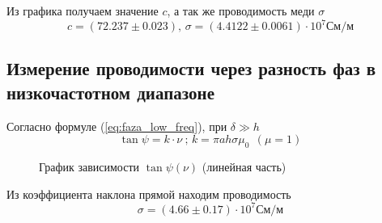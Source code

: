\documentclass[a4paper]{article}
\begin{document}
Из графика получаем значение $c$, а так же проводимость меди $\sigma$
\begin{equation}
    c=(72.237 \pm 0.023) \text{, } \sigma = (4.4122 \pm 0.0061) \cdot 10^7 См/м
\end{equation}

\newpage

\subsection{Измерение проводимости через разность фаз в низкочастотном диапазоне}
Согласно формуле (\ref{eq:faza_low_freq}), при $\delta \gg h$
\begin{equation*}
    \tan \psi = k \cdot \nu \ \text{; } k = \pi a h \sigma \mu_0 \ \ (\mu = 1)
\end{equation*}

\begin{figure}[h]
    \caption{График зависимости $\tan \psi (\nu)$ (линейная часть)}\label{fig:tg_psi_nu_line}
    \newpage
\end{figure}

\vspace{1cm}
Из коэффициента наклона прямой находим проводимость
\begin{equation}
    \sigma = (4.66 \pm 0.17) \cdot 10^7 См/м
\end{equation}

\newpage
\end{document}
